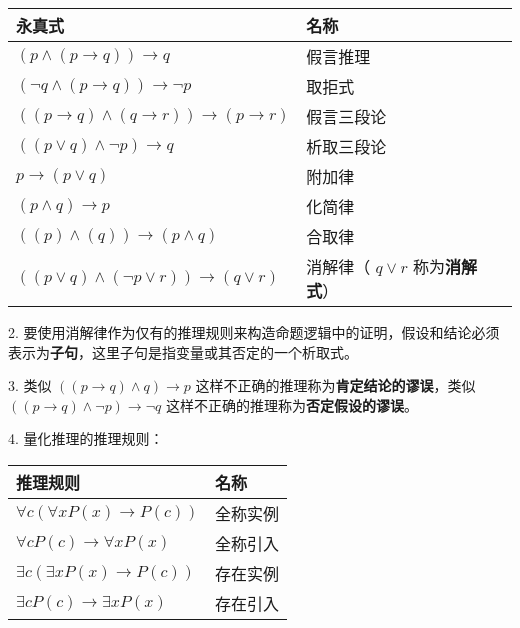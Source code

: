 \documentclass[normal,cyan]{elegantnote}
\begin{document}
\begin{table}[htbp]\centering
    \begin{tabular}{|l|l|}
    \hline
    永真式                                                                   & 名称                                              \\ \hline
    $(p\wedge(p\rightarrow q))\rightarrow q$                              & 假言推理                                            \\ \hline
    $(\neg q\wedge(p\rightarrow q))\rightarrow\neg p$           & 取拒式                                             \\ \hline
    $((p\rightarrow q)\wedge(q\rightarrow r))\rightarrow(p\rightarrow r)$ & 假言三段论                                           \\ \hline
    $((p\vee q)\wedge\neg p)\rightarrow q$                           & 析取三段论                                           \\ \hline
    $p\rightarrow(p\vee q)$                                               & 附加律                                             \\ \hline
    $(p\wedge q)\rightarrow p$                                            & 化简律                                             \\ \hline
    $((p)\wedge(q))\rightarrow(p\wedge q)$                                & 合取律                                             \\ \hline
    $((p\vee q)\wedge(\neg p\vee r))\rightarrow(q\vee r)$            & 消解律（ $q\vee r$ 称为\textbf{消解式}） \\ \hline
    \end{tabular}
\end{table}
2. 要使用消解律作为仅有的推理规则来构造命题逻辑中的证明，假设和结论必须表示为\textbf{子句}，这里子句是指变量或其否定的一个析取式。

3. 类似 $((p\rightarrow q)\wedge q)\rightarrow p$ 这样不正确的推理称为\textbf{肯定结论的谬误}，类似 $((p\rightarrow q)\wedge\neg p)\rightarrow\neg q$ 这样不正确的推理称为\textbf{否定假设的谬误}。

4. 量化推理的推理规则：
\begin{table}[htbp]\centering
    \begin{tabular}{|l|l|}
    \hline
    推理规则                                & 名称   \\ \hline
    $\forall c(\forall xP(x) \to P(c))$ & 全称实例 \\ \hline
    $\forall cP(c) \to \forall xP(x)$   & 全称引入 \\ \hline
    $\exists c(\exists xP(x) \to P(c))$ & 存在实例 \\ \hline
    $\exists cP(c) \to \exists xP(x)$   & 存在引入 \\ \hline
    \end{tabular}
    \end{table}
\end{document}
